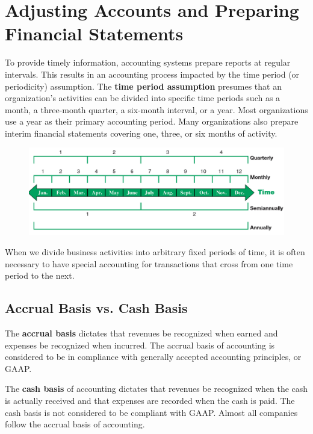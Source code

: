 \documentclass[../main.tex]{subfiles}
\begin{document}
	\section{Adjusting Accounts and Preparing Financial Statements}
	
	To provide timely information, accounting systems prepare reports at 
	regular intervals. This results in an accounting process impacted by the 
	time period (or periodicity) assumption. The \textbf{time period 
	assumption} 
	presumes that an organization’s activities can be divided into specific 
	time periods such as a month, a three-month quarter, a six-month interval, 
	or a year. Most organizations use a year as their primary accounting 
	period. Many organizations also prepare interim financial statements 
	covering one, three, or six months of activity.
	
	\begin{figure}[ht]
		\centering
		\includegraphics[width=1\columnwidth]{images/c3/accounting_period.png}
	\end{figure}
	
	When we divide business activities into arbitrary fixed periods of time, it 
	is often necessary to have special accounting for transactions that cross 
	from one time period to the next.
	
	\subsection{Accrual Basis vs. Cash Basis}
	
	The \textbf{accrual basis} dictates that revenues be recognized when earned 
	and expenses be recognized when incurred. The accrual basis of accounting 
	is considered to be in compliance with generally accepted accounting 
	principles, or GAAP.
	
	The \textbf{cash basis} of accounting dictates that revenues be recognized 
	when the 
	cash is actually received and that expenses are recorded when the cash is 
	paid. The cash basis is not considered to be compliant with GAAP. Almost 
	all companies follow the accrual basis of accounting. 
	
\end{document}
